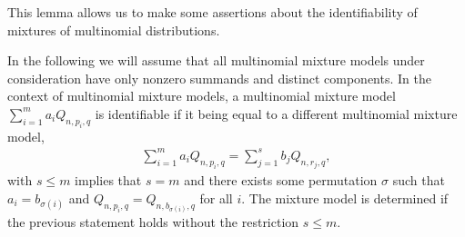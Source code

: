\documentclass[aos,preprint]{imsart}
\theoremstyle{plain}
\theoremstyle{defintion}
\begin{document}
This lemma allows us to make some assertions about the identifiability of mixtures of multinomial distributions.

In the following we will assume that all multinomial mixture models under consideration have only nonzero summands and distinct components. In the context of multinomial mixture models, a multinomial mixture model $\sum_{i=1}^m a_i Q_{n,p_i,q}$ is identifiable if it being equal to a different multinomial mixture model,
\begin{eqnarray*}
	\sum_{i=1}^m a_i Q_{n,p_i,q} = \sum_{j=1}^s b_j Q_{n,r_j,q},
\end{eqnarray*}
with $s\le m$ implies that $s=m$ and there exists some permutation $\sigma$ such that $a_i = b_{\sigma\left( i \right)}$ and $Q_{n,p_i,q} = Q_{n,b_{\sigma\left( i \right)},q}$ for all $i$. The mixture model is determined if the previous statement holds without the restriction $s\le m$.
\end{document}
